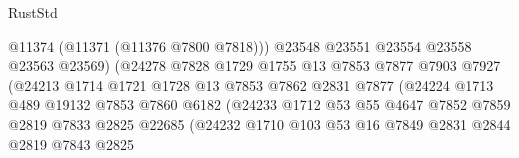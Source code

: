 \begin{lexlean}{RustStd}
\begin{coremodule}
                                        @11374
                                        (@11371 (@11376 @7800 @7818)))
                                      @23548
                                      @23551
                                      @23554
                                      @23558
                                      @23563
                                      @23569)
                                    (@24278
                                      @7828
                                      @1729
                                      @1755
                                      @13
                                      @7853
                                      @7877
                                      @7903
                                      @7927
                                      (@24213
                                        @1714
                                        @1721
                                        @1728
                                        @13
                                        @7853
                                        @7862
                                        @2831
                                        @7877
                                        (@24224
                                          @1713
                                          @489
                                          @19132
                                          @7853
                                          @7860
                                          @6182
                                          (@24233
                                            @1712
                                            @53
                                            @55
                                            @4647
                                            @7852
                                            @7859
                                            @2819
                                            @7833
                                            @2825
                                            @22685
                                            (@24232
                                              @1710
                                              @103
                                              @53
                                              @16
                                              @7849
                                              @2831
                                              @2844
                                              @2819
                                              @7843
                                              @2825

\end{coremodule}
\end{lexlean}
